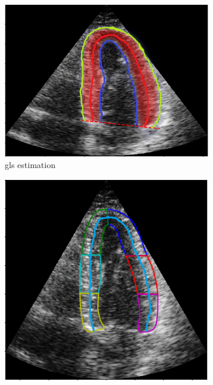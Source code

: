 \begin{figure}[H]
    \centering
    \begin{subfigure}[b]{0.49\textwidth} 
        \includegraphics[width=0.99\textwidth, height=0.9\textwidth]{echocardiography/gls_estimation.png}
        \caption{\acrshort{gls} estimation}
        \label{fig:gls_estimation}
    \end{subfigure}
    \begin{subfigure}[b]{0.49\textwidth}
        \includegraphics[width=0.99\textwidth, height=0.9\textwidth]{echocardiography/rls_estimation.png}

\end{subfigure}
\end{figure}
